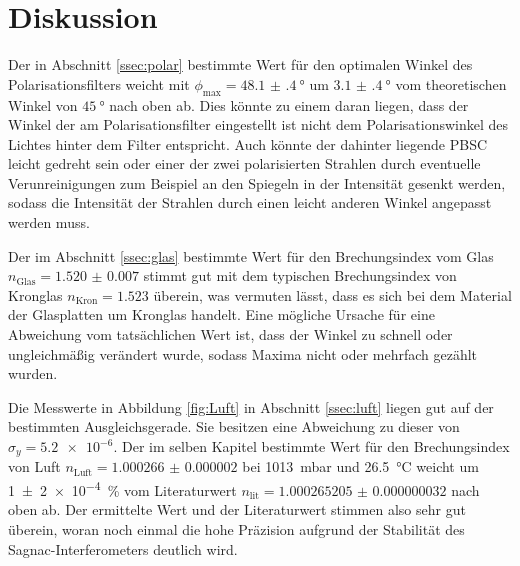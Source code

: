 
\section{Diskussion}
\label{sec:Diskussion}
Der in Abschnitt \ref{ssec:polar} bestimmte Wert für den optimalen Winkel des Polarisationsfilters weicht mit $\phi_\text{max}=\SI{48.1(4)}{\degree}$ um $\SI{3.1(4)}{\degree}$ vom theoretischen Winkel von $\SI{45}{\degree}$ nach oben ab. Dies könnte zu einem daran liegen, dass der Winkel der am Polarisationsfilter eingestellt ist nicht dem Polarisationswinkel des Lichtes hinter dem Filter entspricht. Auch könnte der dahinter liegende PBSC leicht gedreht sein oder einer der zwei polarisierten Strahlen durch eventuelle Verunreinigungen zum Beispiel an den Spiegeln in der Intensität gesenkt werden, sodass die Intensität der Strahlen durch einen leicht anderen Winkel angepasst werden muss. 



Der im Abschnitt \ref{ssec:glas} bestimmte Wert für den Brechungsindex vom Glas $n_\text{Glas}=\num{1.520(7)}$ stimmt gut mit dem typischen Brechungsindex von Kronglas $n_\text{Kron}=\num{1.523}$ \cite{nKron} überein, was vermuten lässt, dass es sich bei dem Material der Glasplatten um Kronglas handelt. Eine mögliche Ursache für eine Abweichung vom tatsächlichen Wert ist, dass der Winkel zu schnell oder ungleichmäßig verändert wurde, sodass Maxima nicht oder mehrfach gezählt wurden.

Die Messwerte in Abbildung \ref{fig:Luft} in Abschnitt \ref{ssec:luft} liegen gut auf der bestimmten Ausgleichsgerade. Sie besitzen eine Abweichung zu dieser von $\sigma_y=\num{5.2e-6}$. Der im selben Kapitel bestimmte Wert für den Brechungsindex von Luft $n_\text{Luft}=\num{1.000266(2)}$ bei \SI{1013}{\milli\bar} und \SI{26.5}{\degreeCelsius} weicht um \SI{1(2)e-4}{\percent} vom Literaturwert $n_\text{lit}=\num{1.000265205(32)}$ \cite{nist} nach oben ab. Der ermittelte Wert und der Literaturwert stimmen also sehr gut überein, woran noch einmal die hohe Präzision aufgrund der Stabilität des Sagnac-Interferometers deutlich wird.


